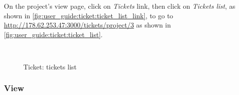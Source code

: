 On the project's view page, click on \emph{Tickets} link, then click on \emph{Tickets list}, as shown in \autoref{fig:user_guide:ticket:ticket_list_link}, to go to \href{http://178.62.253.47:3000/tickets/project/3}{http://178.62.253.47:3000/tickets/project/3} as shown in \autoref{fig:user_guide:ticket:ticket_list}.

\begin{figure}[bth]
\myfloatalign
{} \quad
{} \\
\caption[Ticket: tickets list]{Ticket: tickets list}
\label{fig:user_guide:ticket:ticket_list}
\end{figure}

\clearpage

\subsubsection{View}
\label{ch:result:user_guide:ticket:list}

